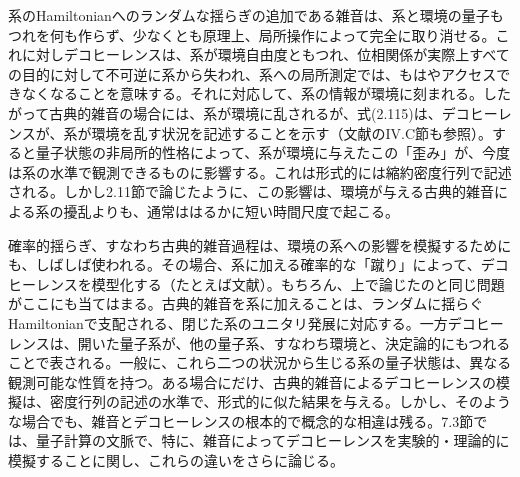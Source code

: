 \hypertarget{srcpage:98}{}\label{srcpage:98}
系のHamiltonianへのランダムな揺らぎの追加である雑音は、系と環境の量子もつれを何も作らず、少なくとも原理上、局所操作によって完全に取り消せる。これに対しデコヒーレンスは、系が環境自由度ともつれ、位相関係が実際上すべての目的に対して不可逆に系から失われ、系への局所測定では、もはやアクセスできなくなることを意味する。それに対応して、系の情報が環境に刻まれる。したがって古典的雑音の場合には、系が環境に乱されるが、式(2.115)は、デコヒーレンスが、系が環境を乱す状況を記述することを示す（文献\cite{ref016}のIV.C節も参照）。すると量子状態の非局所的性格によって、系が環境に与えたこの「歪み」が、今度は系の水準で観測できるものに影響する。これは形式的には縮約密度行列で記述される。しかし2.11節で論じたように、この影響は、環境が与える古典的雑音による系の擾乱よりも、通常ははるかに短い時間尺度で起こる。

確率的揺らぎ、すなわち古典的雑音過程は、環境の系への影響を模擬するためにも、しばしば使われる。その場合、系に加える確率的な「蹴り」によって、デコヒーレンスを模型化する（たとえば文献\cite{ref121,ref123,ref124,ref125}）。もちろん、上で論じたのと同じ問題がここにも当てはまる。古典的雑音を系に加えることは、ランダムに揺らぐHamiltonianで支配される、閉じた系のユニタリ発展に対応する。一方デコヒーレンスは、開いた量子系が、他の量子系、すなわち環境と、決定論的にもつれることで表される。一般に、これら二つの状況から生じる系の量子状態は、異なる観測可能な性質を持つ\cite{ref121}。ある場合にだけ、古典的雑音によるデコヒーレンスの模擬は、密度行列の記述の水準で、形式的に似た結果を与える。しかし、そのような場合でも、雑音とデコヒーレンスの根本的で概念的な相違は残る。7.3節では、量子計算の文脈で、特に、雑音によってデコヒーレンスを実験的・理論的に模擬することに関し、これらの違いをさらに論じる。
